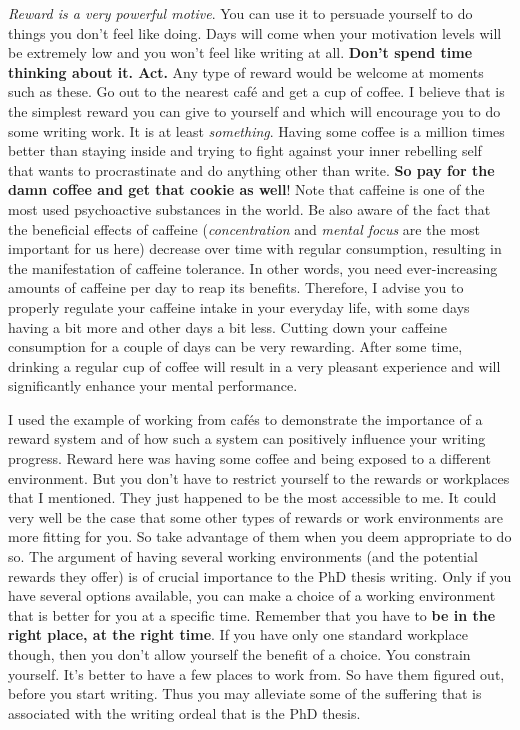 \documentclass[
  12pt,
]{book}
\begin{document}
\emph{Reward is a very powerful motive}.
You can use it to persuade yourself to do things you don't feel like doing.
Days will come when your motivation levels will be extremely low and you won't feel like writing at all.
\textbf{Don't spend time thinking about it.
Act.}
Any type of reward would be welcome at moments such as these.
Go out to the nearest café and get a cup of coffee.
I believe that is the simplest reward you can give to yourself and which will encourage you to do some writing work.
It is at least \emph{something}.
Having some coffee is a million times better than staying inside and trying to fight against your inner rebelling self that wants to procrastinate and do anything other than write.
\textbf{So pay for the damn coffee and get that cookie as well}!
Note that caffeine is one of the most used psychoactive substances in the world.
Be also aware of the fact that the beneficial effects of caffeine (\emph{concentration} and \emph{mental focus} are the most important for us here) decrease over time with regular consumption, resulting in the manifestation of caffeine tolerance.
In other words, you need ever-increasing amounts of caffeine per day to reap its benefits.
Therefore, I advise you to properly regulate your caffeine intake in your everyday life, with some days having a bit more and other days a bit less.
Cutting down your caffeine consumption for a couple of days can be very rewarding.
After some time, drinking a regular cup of coffee will result in a very pleasant experience and will significantly enhance your mental performance.

I used the example of working from cafés to demonstrate the importance of a reward system and of how such a system can positively influence your writing progress.
Reward here was having some coffee and being exposed to a different environment.
But you don't have to restrict yourself to the rewards or workplaces that I mentioned.
They just happened to be the most accessible to me.
It could very well be the case that some other types of rewards or work environments are more fitting for you.
So take advantage of them when you deem appropriate to do so.
The argument of having several working environments (and the potential rewards they offer) is of crucial importance to the PhD thesis writing.
Only if you have several options available, you can make a choice of a working environment that is better for you at a specific time.
Remember that you have to \textbf{be in the right place, at the right time}.
If you have only one standard workplace though, then you don't allow yourself the benefit of a choice.
You constrain yourself.
It's better to have a few places to work from.
So have them figured out, before you start writing.
Thus you may alleviate some of the suffering that is associated with the writing ordeal that is the PhD thesis.
\end{document}
